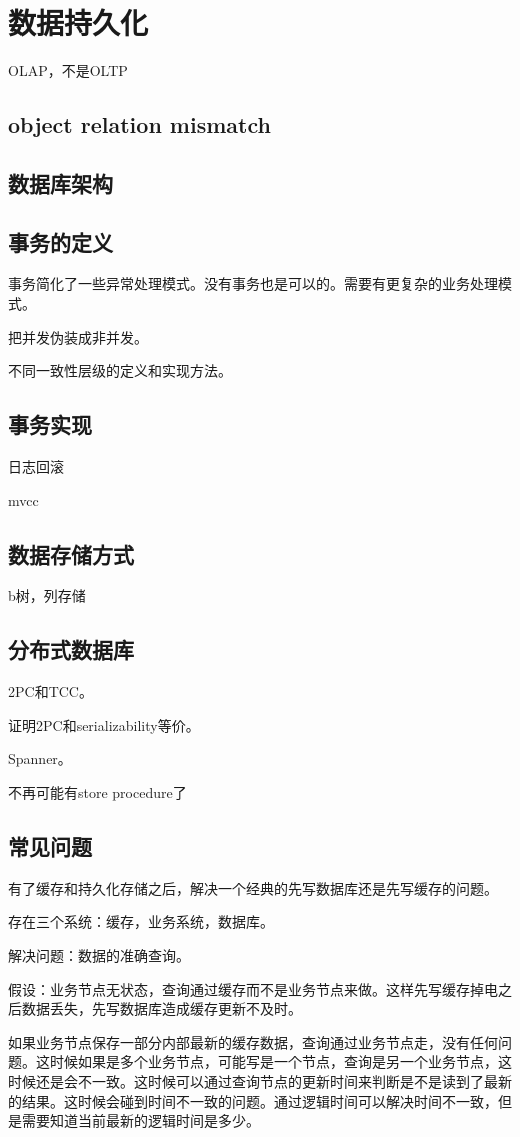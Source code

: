 \chapter{数据持久化}




OLAP，不是OLTP
\section{object relation mismatch}

\section{数据库架构}

\section{事务的定义}
事务简化了一些异常处理模式。没有事务也是可以的。需要有更复杂的业务处理模式。

把并发伪装成非并发。

不同一致性层级的定义和实现方法。

\section{事务实现}
日志回滚

mvcc

\section{数据存储方式}
b树，列存储

\section{分布式数据库}
2PC和TCC。

证明2PC和serializability等价。

Spanner。

不再可能有store procedure了

\section{常见问题}
有了缓存和持久化存储之后，解决一个经典的先写数据库还是先写缓存的问题。

存在三个系统：缓存，业务系统，数据库。

解决问题：数据的准确查询。

假设：业务节点无状态，查询通过缓存而不是业务节点来做。这样先写缓存掉电之后数据丢失，先写数据库造成缓存更新不及时。

如果业务节点保存一部分内部最新的缓存数据，查询通过业务节点走，没有任何问题。这时候如果是多个业务节点，可能写是一个节点，查询是另一个业务节点，这时候还是会不一致。这时候可以通过查询节点的更新时间来判断是不是读到了最新的结果。这时候会碰到时间不一致的问题。通过逻辑时间可以解决时间不一致，但是需要知道当前最新的逻辑时间是多少。
